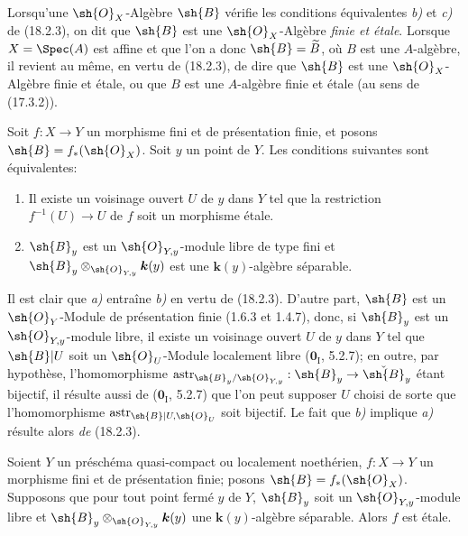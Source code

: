 Lorsqu'une $\sh{O}_X$-Algèbre $\sh{B}$ vérifie les conditions équivalentes \emph{b)} et \emph{c)} de (18.2.3), on dit que $\sh{B}$ est une $\sh{O}_X$-Algèbre \emph{finie et étale}. Lorsque $X=\Spec(A)$ est affine et que l'on a donc $\sh{B}=\widetilde B$, où $B$ est une $A$-algèbre, il revient au même, en vertu de (18.2.3), de dire que $\sh{B}$ est une $\sh{O}_X$-Algèbre finie et étale, ou que $B$ est une $A$-algèbre finie et étale (au sens de (17.3.2)).

\begin{corollary}[18.2.4]
\label{IV.18.2.4}
Soit $f:X\to Y$ un morphisme fini et de présentation finie, et posons $\sh{B}=f_*(\sh{O}_X)$. Soit $y$ un point de $Y$. Les conditions suivantes sont équivalentes:
\begin{enumerate}
  \item[\textup{a)}] Il existe un voisinage ouvert $U$ de $y$ dans $Y$ tel que la restriction $f^{-1}(U)\to U$ de $f$ soit un morphisme étale.
  \item[\textup{b)}] $\sh{B}_y$ est un $\sh{O}_{Y,y}$-module libre de type fini et $\sh{B}_y\otimes_{\sh{O}_{Y,y}}\boldsymbol{k}(y)$ est une $\boldsymbol{k}(y)$-algèbre séparable.
\end{enumerate}
\end{corollary}

Il est clair que \emph{a)} entraîne \emph{b)} en vertu de (18.2.3). D'autre part, $\sh{B}$ est un $\sh{O}_Y$-Module de présentation finie (1.6.3 et 1.4.7), donc, si $\sh{B}_y$ est un $\sh{O}_{Y,y}$-module libre, il existe un voisinage ouvert $U$ de $y$ dans $Y$ tel que $\sh{B}|U$ soit un $\sh{O}_U$-Module localement libre ($\mathbf{0}_{\mathrm I}$, 5.2.7); en outre, par hypothèse, l'homomorphisme $\operatorname{astr}_{\sh{B}_y/\sh{O}_{Y,y}}:\sh{B}_y\to\check{\sh{B}}_y$ étant bijectif, il résulte aussi de ($\mathbf{0}_{\mathrm I}$, 5.2.7) que l'on peut supposer $U$ choisi de sorte que
l'homomorphisme $\operatorname{astr}_{\sh{B}|U,\sh{O}_U}$ soit bijectif. Le fait que \emph{b)} implique \emph{a)} résulte alors \textit{de} (18.2.3).

\begin{corollary}[18.2.5]
\label{IV.18.2.5}
Soient $Y$ un préschéma quasi-compact ou localement noethérien, $f:X\to Y$ un morphisme fini et de présentation finie; posons $\sh{B}=f_*(\sh{O}_X)$. Supposons que pour tout point fermé $y$ de $Y$, $\sh{B}_y$ soit un $\sh{O}_{Y,y}$-module libre et $\sh{B}_y\otimes_{\sh{O}_{Y,y}}\boldsymbol{k}(y)$ une $\boldsymbol{k}(y)$-algèbre séparable. Alors $f$ est étale.
\end{corollary}

